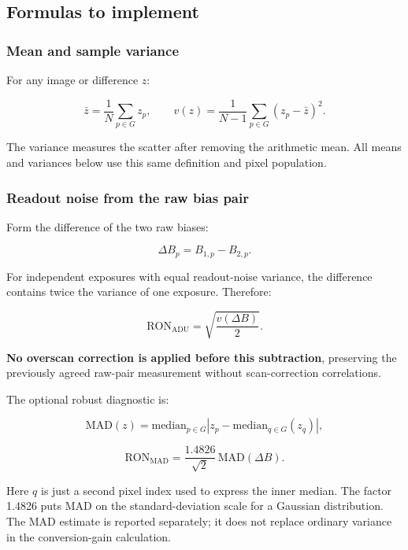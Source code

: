 \documentclass[
  10pt,
  a4paper,
]{article}
\begin{document}
\hypertarget{formulas-to-implement}{%
\subsection{Formulas to implement}\label{formulas-to-implement}}

\hypertarget{mean-and-sample-variance}{%
\subsubsection{Mean and sample
variance}\label{mean-and-sample-variance}}

For any image or difference \(z\):

\[
\bar z = \frac{1}{N}\sum_{p\in G} z_p ,
\qquad
v(z) = \frac{1}{N-1}\sum_{p\in G}(z_p-\bar z)^2 .
\]

The variance measures the scatter after removing the arithmetic mean.
All means and variances below use this same definition and pixel
population.

\hypertarget{readout-noise-from-the-raw-bias-pair}{%
\subsubsection{Readout noise from the raw bias
pair}\label{readout-noise-from-the-raw-bias-pair}}

Form the difference of the two raw biases:

\[
\Delta B_p = B_{1,p}-B_{2,p}.
\]

For independent exposures with equal readout-noise variance, the
difference contains twice the variance of one exposure. Therefore:

\[
\boxed{\mathrm{RON}_{\mathrm{ADU}}
       = \sqrt{\frac{v(\Delta B)}{2}} } .
\]

\textbf{No overscan correction is applied before this subtraction},
preserving the previously agreed raw-pair measurement without
scan-correction correlations.

The optional robust diagnostic is:

\[
\mathrm{MAD}(z)
 = \mathrm{median}_{p\in G}
   \left|z_p-\mathrm{median}_{q\in G}(z_q)\right| ,
\]

\[
\mathrm{RON}_{\mathrm{MAD}}
 = \frac{1.4826}{\sqrt{2}}\,\mathrm{MAD}(\Delta B).
\]

Here \(q\) is just a second pixel index used to express the inner
median. The factor 1.4826 puts MAD on the standard-deviation scale for a
Gaussian distribution. The MAD estimate is reported separately; it does
not replace ordinary variance in the conversion-gain calculation.
\end{document}
